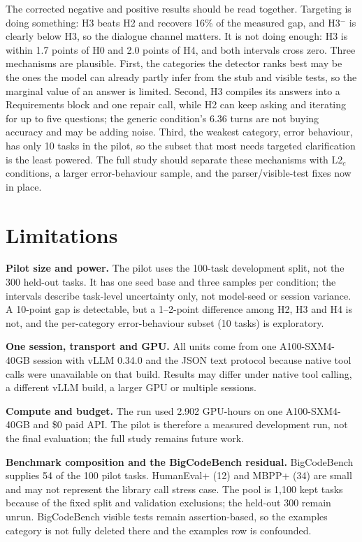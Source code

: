 \documentclass{article}
\begin{document}
The corrected negative and positive results should be read together. Targeting is doing
something: H3 beats H2 and recovers 16\% of the measured gap, and H3$^-$ is clearly below H3,
so the dialogue channel matters. It is not doing enough: H3 is within 1.7 points of H0 and
2.0 points of H4, and both intervals cross zero. Three mechanisms are plausible. First, the
categories the detector ranks best may be the ones the model can already partly infer from the
stub and visible tests, so the marginal value of an answer is limited. Second, H3 compiles its
answers into a Requirements block and one repair call, while H2 can keep asking and iterating
for up to five questions; the generic condition's 6.36 turns are not buying accuracy and may
be adding noise. Third, the weakest category, error behaviour, has only 10 tasks in the
pilot, so the subset that most needs targeted clarification is the least powered. The full
study should separate these mechanisms with L2$_c$ conditions, a larger error-behaviour
sample, and the parser/visible-test fixes now in place.

\section{Limitations}
\label{sec:limitations}

\textbf{Pilot size and power.} The pilot uses the 100-task development split, not the 300
held-out tasks. It has one seed base and three samples per condition; the intervals describe
task-level uncertainty only, not model-seed or session variance. A 10-point gap is detectable,
but a 1--2-point difference among H2, H3 and H4 is not, and the per-category error-behaviour
subset (10 tasks) is exploratory.

\textbf{One session, transport and GPU.} All units come from one A100-SXM4-40GB session with
vLLM 0.34.0 and the JSON text protocol because native tool calls were unavailable on that
build. Results may differ under native tool calling, a different vLLM build, a larger GPU or
multiple sessions.

\textbf{Compute and budget.} The run used 2.902 GPU-hours on one A100-SXM4-40GB and \$0 paid
API. The pilot is therefore a measured development run, not the final evaluation; the full
study remains future work.

\textbf{Benchmark composition and the BigCodeBench residual.} BigCodeBench supplies 54 of the
100 pilot tasks. HumanEval+ (12) and MBPP+ (34) are small and may not represent the library
call stress case. The pool is 1{,}100 kept tasks because of the fixed split and validation
exclusions; the held-out 300 remain unrun. BigCodeBench visible tests remain assertion-based,
so the examples category is not fully deleted there and the examples row is confounded.
\end{document}
